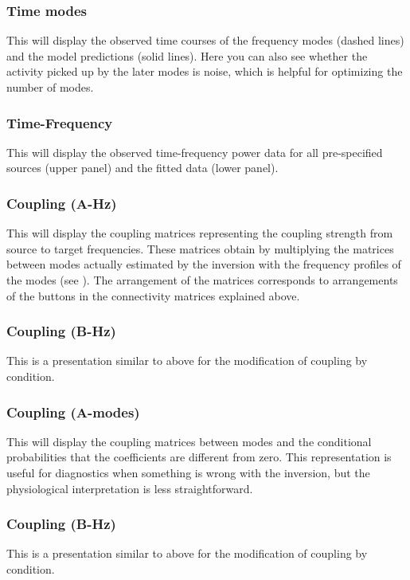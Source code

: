 \subsubsection{Time modes}
This will display the observed time courses of the frequency modes (dashed lines) and the model predictions (solid lines). Here you can also see whether the activity picked up by the later modes is noise, which is helpful for optimizing the number of modes. 

\subsubsection{Time-Frequency}
This will display the observed time-frequency power data for all pre-specified sources (upper panel) and the fitted data (lower panel).

\subsubsection{Coupling (A-Hz)}
This will display the coupling matrices representing the coupling strength from source to target frequencies. These matrices obtain by multiplying the matrices between modes actually estimated by the inversion with the frequency profiles of the modes (see \cite{cc_induced}). The arrangement of the matrices corresponds to arrangements of the buttons in the connectivity matrices explained above.

\subsubsection{Coupling (B-Hz)}
This is a presentation similar to above for the modification of coupling by condition. 

\subsubsection{Coupling (A-modes)}
This will display the coupling matrices between modes and the conditional probabilities that the coefficients are different from zero. This representation is useful for diagnostics when something is wrong with the inversion, but the physiological interpretation is less straightforward.

\subsubsection{Coupling (B-Hz)}
This is a presentation similar to above for the modification of coupling by condition. 

